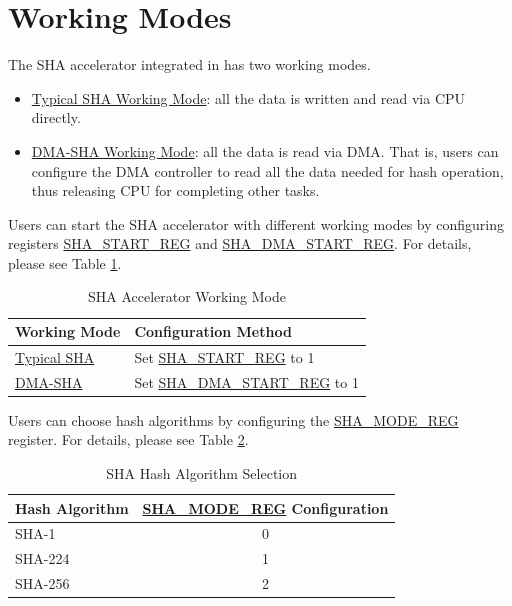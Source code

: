 \documentclass[main\_\_EN.tex]{subfiles}
\begin{document}
\section{Working Modes}
The SHA accelerator integrated in \chipname{} has two working modes.

\begin{itemize}
    \item \hyperref[sec:sha-typical-sha]{Typical SHA Working Mode}: all the data is written and read via CPU directly.
    \item \hyperref[sec:sha-dma-sha]{DMA-SHA Working Mode}: all the data is read via DMA. That is, users can configure the DMA controller to read all the data needed for hash operation, thus releasing CPU for completing other tasks.
\end{itemize}    

Users can start the SHA accelerator with different working modes by configuring registers \hyperref[regdesc:SHASTARTREG]{SHA\_START\_REG} and \hyperref[regdesc:SHADMASTARTREG]{SHA\_DMA\_START\_REG}. For details, please see Table \ref{tab:sha-working-mode}.
\begin{longtable}[c]{ | l | l | }
\caption{SHA Accelerator Working Mode}
\label{tab:sha-working-mode}
\\\hline 
\rowcolor{lightgray}
Working Mode      & Configuration Method\\
    \hline
    \hyperref[sec:sha-typical-sha]{Typical SHA}      &  Set \hyperref[regdesc:SHASTARTREG]{SHA\_START\_REG} to 1   \\
    \hline
    \hyperref[sec:sha-dma-sha]{DMA-SHA}           &  Set \hyperref[regdesc:SHADMASTARTREG]{SHA\_DMA\_START\_REG} to 1   \\
    \hline
\end{longtable}

\clearpage
Users can choose hash algorithms by configuring the \hyperref[regdesc:SHAMODEREG]{SHA\_MODE\_REG} register. For details, please see Table \ref{tab:sha-hash-algo-select}.

\begin{longtable}[c]{| l | c |}
\caption{SHA Hash Algorithm Selection}
\label{tab:sha-hash-algo-select}
\\\hline
\rowcolor{lightgray}
Hash Algorithm & \hyperref[regdesc:SHAMODEREG]{SHA\_MODE\_REG} Configuration\\
    \hline
    SHA-1 & 0\\
    \hline
    SHA-224 & 1\\
    \hline
    SHA-256 & 2 \\\hline 
\end{longtable}
\end{document}
